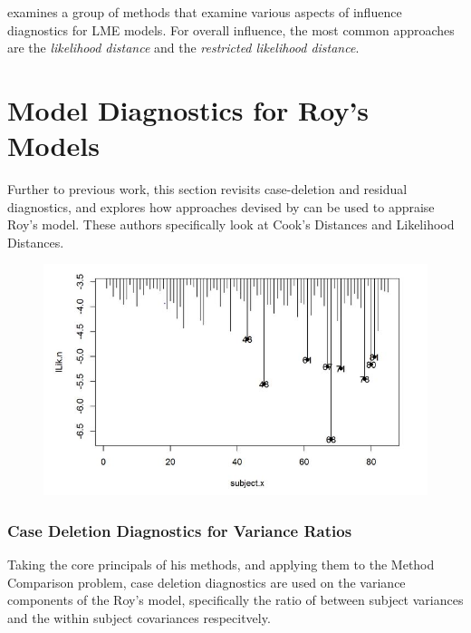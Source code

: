 \documentclass[12pt, a4paper]{report}
\theoremstyle{plain}
\theoremstyle{definition}
\theoremstyle{remark}
\begin{document}
\citet{west} examines a group of methods that examine various aspects of influence diagnostics for LME models. For overall influence, the most common approaches are the \textit{likelihood distance} and the \textit{restricted likelihood distance}.



\section{Model Diagnostics for Roy's Models}

Further to previous work, this section revisits case-deletion and residual diagnostics, and explores how approaches devised by  \citet{Galecki} can be used to appraise Roy's model. These authors specifically look at Cook's Distances and Likelihood Distances.
%	





\begin{figure}[h!]
	\centering
	\includegraphics[width=0.7\linewidth]{images/LogLik-JS-Roy}
	\caption{}
	\label{fig:LogLik-JS-Roy}
\end{figure}








\subsubsection{Case Deletion Diagnostics for Variance Ratios}


Taking the core principals of his methods, and applying them to the Method Comparison problem, case deletion diagnostics are used on the variance components of the Roy's model, specifically the ratio of between subject variances and the within subject covariances respecitvely.
\end{document}
